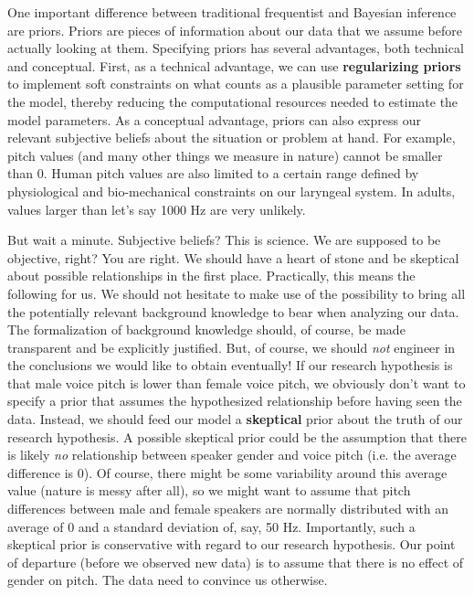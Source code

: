 \documentclass[nobib]{tufte-handout}
\begin{document}
One important difference between traditional frequentist and Bayesian inference are priors. Priors are pieces of information about our data that we assume before actually looking at them. Specifying priors has several advantages, both technical and conceptual. First, as a technical advantage, we can use \textbf{regularizing priors} to implement soft constraints on what counts as a plausible parameter setting for the model, thereby reducing the computational resources needed to estimate the model parameters.
%
%
As a conceptual advantage, priors can also express our relevant subjective beliefs about the situation or problem at hand. For example, pitch values (and many other things we measure in nature) cannot be smaller than 0. Human pitch values are also limited to a certain range defined by physiological and bio-mechanical constraints on our laryngeal system. In adults, values larger than let's say 1000 Hz are very unlikely. 
 
But wait a minute. Subjective beliefs? This is science. We are supposed to be objective, right? You are right. We should have a heart of stone and be skeptical about possible relationships in the first place.
Practically, this means the following for us. We should not hesitate to make use of the possibility to bring all the potentially relevant background knowledge to bear when analyzing our data. The formalization of background knowledge should, of course, be made transparent and be explicitly justified. But, of course, we should \emph{not} engineer in the conclusions we would like to obtain eventually! If our research hypothesis is that male voice pitch is lower than female voice pitch, we obviously don't want to specify a prior that assumes the hypothesized relationship before having seen the data. Instead, we should feed our model a \textbf{skeptical} prior about the truth of our research hypothesis. A possible skeptical prior could be the assumption that there is likely \textit{no} relationship between speaker gender and voice pitch (i.e. the average difference is 0). Of course, there might be some variability around this average value (nature is messy after all), so we might want to assume that pitch differences between male and female speakers are normally distributed with an average of 0 and a standard deviation of, say, 50 Hz. Importantly, such a skeptical prior is conservative with regard to our research hypothesis. Our point of departure (before we observed new data) is to assume that there is no effect of gender on pitch. The data need to convince us otherwise.
\end{document}
